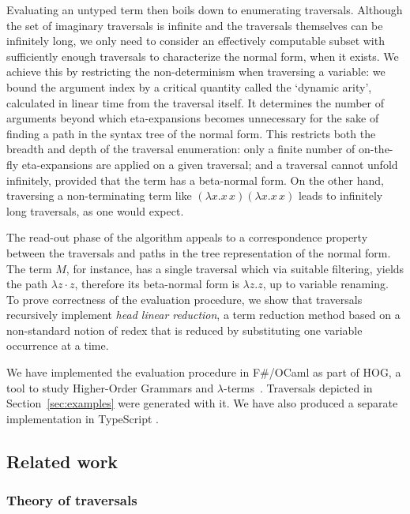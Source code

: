 \documentclass[xchauthor,chkrefs,GCNS,amsmath,amsthm,rotating,leaveRGB]{tcsg}
\theoremstyle{plain}
\theoremstyle{definition}
\begin{document}
Evaluating an untyped term then boils down to enumerating traversals.
Although the set of imaginary traversals is infinite and the traversals
themselves can be infinitely long, we only need to consider an effectively
computable subset with sufficiently enough traversals to characterize the
normal form, when it exists. We achieve this by restricting the
non-determinism when traversing a variable: we bound the argument index by a
critical quantity called the `dynamic arity', calculated in linear time from
the traversal itself. It determines the number of arguments beyond which
eta-expansions becomes unnecessary for the sake of finding a path in the
syntax tree of the normal form. This restricts both the breadth and depth of
the traversal enumeration: only a finite number of on-the-fly eta-expansions
are applied on a given traversal; and a traversal cannot unfold infinitely,
provided that the term has a beta-normal form. On the other hand, traversing
a non-terminating term like $(\lambda x. x\,x)(\lambda x. x\,x)$ leads to
infinitely long traversals, as one would expect.

The read-out phase of the algorithm appeals to a correspondence property
between the traversals and paths in the tree representation of the normal
form. The term $M$, for instance, has a single traversal which via suitable
filtering, yields the path $\lambda z \cdot z$, therefore its beta-normal
form is $\lambda z. z$, up to variable renaming. To prove correctness of the
evaluation procedure, we show that traversals recursively implement
\emph{head linear reduction}, a term reduction method based on a non-standard
notion of redex that is reduced by substituting one variable occurrence at a
time.

We have implemented the evaluation procedure in F\#/OCaml as part of HOG, a
tool to study Higher-Order Grammars and $\lambda
$-terms~\cite{BlumGalop2008,Blum-HogTool}. Traversals depicted in
Section~\ref{sec:examples} were generated with it. We have also produced a
separate implementation in TypeScript \cite{BlumTypeScriptTraversal2019}.

\subsection{Related work}\label{sec1.3}

\subsubsection{Theory of traversals}\label{sec1.3.1}
\end{document}
